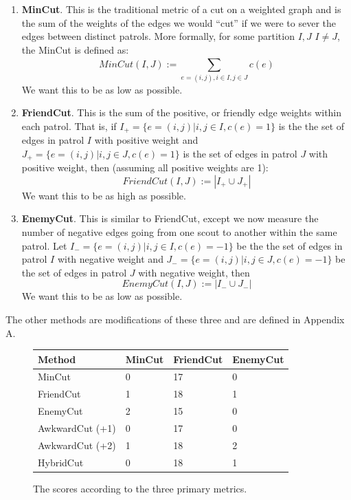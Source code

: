 \documentclass{amsart}
\theoremstyle{definition}
\theoremstyle{remark}
\numberwithin{equation}{section}
\begin{document}
\begin{enumerate}
\item \textbf{MinCut}. This is the traditional metric of a cut on a weighted graph and is the sum of the weights of the edges we would ``cut'' if we were to sever the edges between distinct patrols. More formally, for some partition $I, J$ $I \neq J$, the MinCut is defined as:
$$
MinCut(I, J) := \sum_{e = (i, j), i \in I, j \in J}^{} c(e)
$$
We want this to be as low as possible.
\item \textbf{FriendCut}. This is the sum of the positive, or friendly edge weights within each patrol. That is, if $I_+ = \{e=(i,j) | i,j \in I, c(e)=1\}$ is the the set of edges in patrol $I$ with positive weight and $J_+ = \{e=(i,j) | i,j \in J, c(e)=1\}$ is the set of edges in patrol $J$ with positive weight, then (assuming all positive weights are 1):
$$
FriendCut(I, J) :=  |I_+ \cup J_+|
$$
We want this to be as high as possible.
\item \textbf{EnemyCut}. This is similar to FriendCut, except we now measure the number of negative edges going from one scout to another within the same patrol. Let $I_- = \{e=(i,j) | i,j \in I, c(e)=-1\}$ be the the set of edges in patrol $I$ with negative weight and $J_- = \{e=(i,j) | i,j \in J, c(e)=-1\}$ be the set of edges in patrol $J$ with negative weight, then
$$
EnemyCut(I, J) := |I_- \cup J_-|
$$
    We want this to be as low as possible.
\end{enumerate}

The other methods are modifications of these three and are defined in Appendix A.

\clearpage 

\begin{figure}[h]
    \centering
    \begin{tabular}{ |l|l|l|l| }
        \hline
        \textbf{Method} & \textbf{MinCut} & \textbf{FriendCut} & \textbf{EnemyCut} \\
        \hline
        MinCut & 0 & 17 & 0 \\
        FriendCut & 1 & 18 & 1 \\
        EnemyCut & 2 & 15 & 0 \\
        AwkwardCut (+1) & 0 & 17 & 0 \\
        AwkwardCut (+2) & 1 & 18 & 2 \\
        HybridCut & 0 & 18 & 1 \\
        \hline
    \end{tabular}
    \caption{The scores according to the three primary metrics.}
\end{figure}
\end{document}
